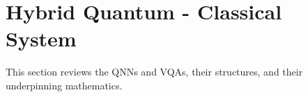 \section{Hybrid Quantum - Classical System} \label{Sec: Hybrid Quantum - Classical System}

This section reviews the QNNs and VQAs, their structures, and their underpinning mathematics.





